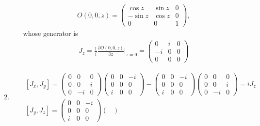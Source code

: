 \documentclass[11pt]{article}
\def\del{{\partial}}
\begin{document}
\begin{enumerate}
\begin{itemize}
        \begin{eqnarray}
            O(0,0,z)=
            \begin{pmatrix}
                \cos z& \sin z    & 0\\
                -\sin z&\cos z & 0\\
               0 &0 & 1
            \end{pmatrix},
        \end{eqnarray}
        whose generator is
        \begin{eqnarray}
            J_z=\frac{1}{i}\frac{\del O(0,0,z)}{\del z}|_{z=0} =
            \begin{pmatrix}
                0&i&0\\
                -i&0&0\\
                0&0&0
            \end{pmatrix} 
        \end{eqnarray}
      \end{itemize} 
    \item
    \begin{eqnarray}
        &&[ J_x, J_y ] = 
        \begin{pmatrix}
            0&0&0\\
            0&0&i\\
            0&-i&0
        \end{pmatrix}
        \begin{pmatrix}
            0&0&-i\\
            0&0&0\\
            i&0&0
        \end{pmatrix}
        -
        \begin{pmatrix}
            0&0&-i\\
            0&0&0\\
            i&0&0
        \end{pmatrix}
        \begin{pmatrix}
            0&0&0\\
            0&0&i\\
            0&-i&0
        \end{pmatrix}
        =i J_z \\
        &&[ J_y, J_z ] = 
        \begin{pmatrix}
            0&0&-i\\
            0&0&0\\
            i&0&0
        \end{pmatrix}
        \begin{pmatrix}

\end{pmatrix}
\end{eqnarray}
\end{enumerate}
\end{document}
